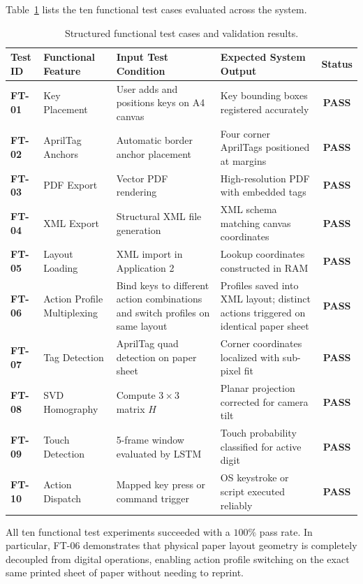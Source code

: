 Table~\ref{tab:functional_test_cases} lists the ten functional test cases evaluated across the system.

\begin{table}[htbp]
\centering
\caption{Structured functional test cases and validation results.}
\label{tab:functional_test_cases}
\begin{tabular}{p{1.2cm} p{3.5cm} p{4.5cm} p{4.0cm} c}
\toprule
\textbf{Test ID} & \textbf{Functional Feature} & \textbf{Input Test Condition} & \textbf{Expected System Output} & \textbf{Status} \\
\midrule
\textbf{FT-01} & Key Placement & User adds and positions keys on A4 canvas & Key bounding boxes registered accurately & \textbf{PASS} \\
\textbf{FT-02} & AprilTag Anchors & Automatic border anchor placement & Four corner AprilTags positioned at margins & \textbf{PASS} \\
\textbf{FT-03} & PDF Export & Vector PDF rendering & High-resolution PDF with embedded tags & \textbf{PASS} \\
\textbf{FT-04} & XML Export & Structural XML file generation & XML schema matching canvas coordinates & \textbf{PASS} \\
\textbf{FT-05} & Layout Loading & XML import in Application 2 & Lookup coordinates constructed in RAM & \textbf{PASS} \\
\textbf{FT-06} & Action Profile Multiplexing & Bind keys to different action combinations and switch profiles on same layout & Profiles saved into XML layout; distinct actions triggered on identical paper sheet & \textbf{PASS} \\
\textbf{FT-07} & Tag Detection & AprilTag quad detection on paper sheet & Corner coordinates localized with sub-pixel fit & \textbf{PASS} \\
\textbf{FT-08} & SVD Homography & Compute $3 \times 3$ matrix $H$ & Planar projection corrected for camera tilt & \textbf{PASS} \\
\textbf{FT-09} & Touch Detection & 5-frame window evaluated by LSTM & Touch probability classified for active digit & \textbf{PASS} \\
\textbf{FT-10} & Action Dispatch & Mapped key press or command trigger & OS keystroke or script executed reliably & \textbf{PASS} \\
\bottomrule
\end{tabular}%
\end{table}

All ten functional test experiments succeeded with a $100\%$ pass rate. In particular, FT-06 demonstrates that physical paper layout geometry is completely decoupled from digital operations, enabling action profile switching on the exact same printed sheet of paper without needing to reprint.

